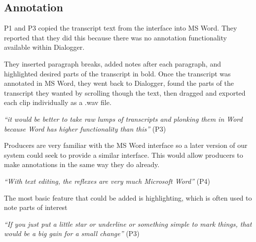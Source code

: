 



\subsection{Annotation}


P1 and P3 copied the transcript text from the interface into MS Word. They reported that they did this because there
was no annotation functionality available within Dialogger.

They inserted paragraph breaks, added notes after each paragraph, and highlighted desired parts of the transcript in
bold. Once the transcript was annotated in MS Word, they went back to Dialogger, found the parts of the transcript they
wanted by scrolling though the text, then dragged and exported each clip individually as a .wav file.

\textit{``it would be better to take raw lumps of transcripts and plonking them in Word because Word has higher
  functionality than this''} (P3)

Producers are very familiar with the MS Word interface so a later version of our system could seek to provide a similar
interface. This would allow producers to make annotations in the same way they do already.

\textit{``With text editing, the reflexes are very much Microsoft Word''} (P4)

The most basic feature that could be added is highlighting, which is often used to note parts of interest

\textit{``If you just put a little star or underline or something simple to mark things, that would be a big gain for a
  small change''} (P3)

